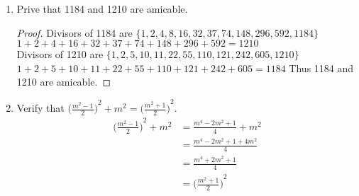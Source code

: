 \documentclass[11pt]{article}
\begin{document}
\begin{enumerate}
\begin{proof}
        Hypothesis ($n=k$): \\
        Assume $t_k= \sum\limits_{i=1}^{k}i=1+2+\cdots+k=\displaystyle\frac{k(k+1)}{2}$ $\forall k \in \mathbb{Z}^{+}$ \\
        Induction ($n=k+1$): \\
        Consider $\sum\limits_{i=1}^{k+1}i$, then
        \begin{align*}
            \sum_{i=1}^{k+1}i &= 1+2+\cdots+k+(k+1) \\
            &= \frac{k(k+1)}{2} + (k+1) && \text{(Hypothesis)} \\
            &= \frac{k^2+k+2(k+1)}{2} \\
            &= \frac{k^2+3k+2}{2} \\
            &= \frac{(k+1)(k+2)}{2} = \frac{(k+1)((k+1)+1)}{2}
        \end{align*}
        \[\therefore t_n=\sum\limits_{i=1}^{n}i=\displaystyle\frac{n(n+1)}{2}\]
    \end{proof}
    \item Prive that 1184 and 1210 are amicable.
    \begin{proof}
    Divisors of 1184 are $\{1, 2, 4, 8, 16, 32, 37, 74,148, 296, 592, 1184\}$ \\
    $1+2+4+16+32+37+74+148+296+592=1210$ \\
    Divisors of 1210 are $\{1, 2, 5, 10, 11, 22, 55, 110, 121, 242, 605, 1210\}$ \\
    $1+2+5+10+11+22+55+110+121+242+605=1184$
    Thus 1184 and 1210 are amicable.
    \end{proof}
    
    \item Verify that ${\bigg(\frac{m^2-1}{2}\bigg)}^2+m^2={\bigg(\frac{m^2+1}{2}\bigg)}^2$.
    \begin{align*}
        {\Bigg(\frac{m^2-1}{2}\Bigg)}^2+m^2 &= \frac{m^4-2m^2+1}{4}+m^2 \\
        &= \frac{m^4-2m^2+1+4m^2}{4} \\
        &= \frac{m^4+2m^2+1}{4} \\
        &= {\Bigg(\frac{m^2+1}{2}\Bigg)}^2
    \end{align*}
\end{enumerate}
\end{document}
